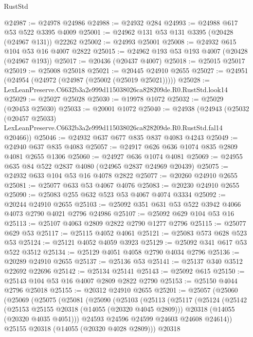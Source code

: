 \begin{lexlean}{RustStd}
\begin{coremodule}
@24987 := @24978 @24986
@24988 := @24932 @284
@24993 := @24988 @617 @53 @522 @3395 @4009
@25001 := @24962 @131 @53 @131 @3395 (@20428 (@24967 @131)) @22262
@25002 := @24993 @25001
@25008 := @24932 @615 @104 @53 @16 @4007 @2822
@25015 := @24962 @193 @53 @193 @4007 (@20428 (@24967 @193))
@25017 := @20436 (@20437 @4007)
@25018 := @25015 @25017
@25019 := @25008 @25018
@25021 := @20445 @24910 @2655
@25027 := @24951 (@24954 (@24972 (@24987 (@25002 (@25019 @25021)))))
@25028 := LexLeanPreserve.C6632b3a2e999d115038026ca828209de.R0.RustStd.look14
@25029 := @25027 @25028
@25030 := @19978 @1072
@25032 := @25029 (@20453 @25030)
@25033 := @20001 @1072
@25040 := @24938
    (@24943
      (@25032
        (@20457 @25033)
        LexLeanPreserve.C6632b3a2e999d115038026ca828209de.R0.RustStd.fal14
        @20466))
@25046 := @24932 @637 @677 @835 @837 @4083 @4243
@25049 := @24940 @637 @835 @4083
@25057 := @24917 @626 @636 @1074 @835 @2809 @4081 @2655 @1306
@25060 := @24927 @636 @1074 @4081
@25069 := @24955 @635 @84 @522 @2837 @4080 (@24965 @2837 @24969 @20439)
@25075 := @24932 @633 @104 @53 @16 @4078 @2822
@25077 := @20260 @24910 @2655
@25081 := @25077 @633 @53 @4067 @4076
@25083 := @20230 @24910 @2655
@25090 := @25083 @255 @632 @523 @53 @4067 @4074 @3334
@25092 := @20244 @24910 @2655
@25103 := @25092 @351 @631 @53 @522 @3942 @4066 @4073 @2790 @4021 @2796 @24986
@25107 := @25092 @629 @104 @53 @16
@25113 := @25107 @4063 @2809 @2822 @2790 @1277 @2796
@25115 := @25077 @629 @53
@25117 := @25115 @4052 @4061
@25121 := @25083 @573 @628 @523 @53
@25124 := @25121 @4052 @4059 @3923
@25129 := @25092 @341 @617 @53 @522 @3512
@25134 := @25129 @4051 @4058 @2790 @4034 @2796
@25136 := @20289 @24910 @2655
@25137 := @25136 @53
@25141 := @25137 @340 @3512 @22692 @22696
@25142 := @25134 @25141
@25143 := @25092 @615
@25150 := @25143 @104 @53 @16 @4007 @2809 @2822 @2790
@25153 := @25150 @4044 @2796 @25018
@25155 := @20312 @24910 @2655
@25201 := @25057
    (@25060
      (@25069
        (@25075
          (@25081
            (@25090
              (@25103
                (@25113
                  (@25117
                    (@25124
                      (@25142
                        (@25153 @25155 @20318 (@14055 (@20320 @4045 @2809)))
                        @20318
                        (@14055 (@20320 @4035 @4051)))
                      @24593
                      @24596
                      @24599
                      @24603
                      @24608
                      @24614))
                  @25155
                  @20318
                  (@14055 (@20320 @4028 @2809)))
                @20318

\end{coremodule}
\end{lexlean}
